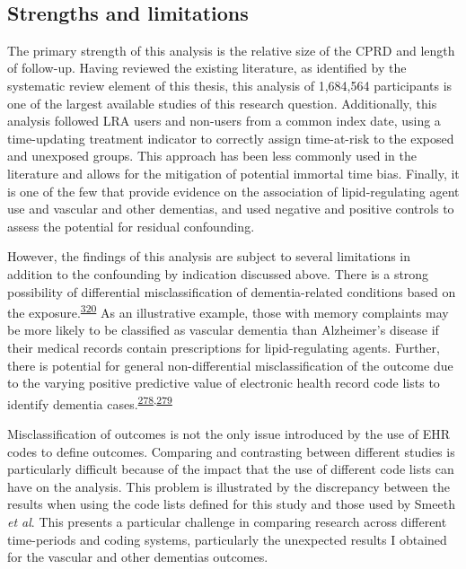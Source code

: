 \documentclass[a4paper, twoside]{templates/ociamthesis}
\begin{document}
~

\hypertarget{cprd-limitations}{%
\subsection{Strengths and limitations}\label{cprd-limitations}}

The primary strength of this analysis is the relative size of the CPRD and length of follow-up. Having reviewed the existing literature, as identified by the systematic review element of this thesis, this analysis of 1,684,564 participants is one of the largest available studies of this research question. Additionally, this analysis followed LRA users and non-users from a common index date, using a time-updating treatment indicator to correctly assign time-at-risk to the exposed and unexposed groups. This approach has been less commonly used in the literature and allows for the mitigation of potential immortal time bias. Finally, it is one of the few that provide evidence on the association of lipid-regulating agent use and vascular and other dementias, and used negative and positive controls to assess the potential for residual confounding.

However, the findings of this analysis are subject to several limitations in addition to the confounding by indication discussed above. There is a strong possibility of differential misclassification of dementia-related conditions based on the exposure.\textsuperscript{\protect\hyperlink{ref-porta2014}{320}} As an illustrative example, those with memory complaints may be more likely to be classified as vascular dementia than Alzheimer's disease if their medical records contain prescriptions for lipid-regulating agents. Further, there is potential for general non-differential misclassification of the outcome due to the varying positive predictive value of electronic health record code lists to identify dementia cases.\textsuperscript{\protect\hyperlink{ref-mcguinness2019validity}{278},\protect\hyperlink{ref-wilkinson2018}{279}}

Misclassification of outcomes is not the only issue introduced by the use of EHR codes to define outcomes. Comparing and contrasting between different studies is particularly difficult because of the impact that the use of different code lists can have on the analysis. This problem is illustrated by the discrepancy between the results when using the code lists defined for this study and those used by Smeeth \emph{et al}. This presents a particular challenge in comparing research across different time-periods and coding systems, particularly the unexpected results I obtained for the vascular and other dementias outcomes.
\end{document}
